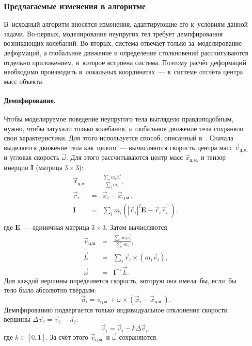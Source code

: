 \documentclass[a4paper, 14pt, titlepage]{extarticle}
\newcommand{\vect}[1]{\vec{#1}} %
\newcommand{\matx}[1]{\mathbf{#1}} %
\newcommand{\transposed}{\top} %
\begin{document}
      \subsubsection{Предлагаемые изменения в алгоритме}\label{sssec:proposed_changes}

        В~исходный алгоритм вносятся изменения, адаптирующие его к~условиям данной
        задачи. Во-первых, моделирование неупругих тел требует демпфирования возникающих колебаний.
        Во-вторых, система отвечает только за~моделирование деформаций, а глобальное движение и
        определение столкновений рассчитываются отдельно приложением, в~которое встроена система.
        Поэтому расчёт деформаций необходимо производить в~локальных координатах~--- в~системе отсчёта
        центра масс объекта.

        \paragraph{Демпфирование.} Чтобы моделируемое поведение неупругого тела выглядело правдоподобным,
        нужно, чтобы затухали только колебания, а глобальное движение тела сохраняло свои характеристики.
        Для этого используется способ, описанный в~\cite[с.~5]{mueller-position-dynamics}. Сначала выделяется
        движение тела как~целого~--- вычисляются скорость центра масс $\vect{v}_{ц.м.}$ и угловая
        скорость $\vect{\omega}$. Для этого рассчитываются центр масс
        $\vect{x}_{ц.м.}$ и тензор инерции $\matx I$ (матрица $3 \times 3$):
        \begin{eqnarray*}
          \vect{x}_{ц.м.} & = & \frac{\sum_i m_i \vect{x_i}}{\sum_i m_i},\\
          \vect{r}_i      & = & \vect{x}_i - \vect{x}_{ц.м.},\\
          \matx{I}        & = & \sum_i m_i ( |\vect{r}_i|^2 \matx E - \vect{r}_i \vect{r}_i^\transposed),\\
        \end{eqnarray*}
        где $\matx E$~--- единичная матрица $3 \times 3$. Затем вычисляются
        \begin{eqnarray*}
          \vect{v}_{ц.м.} & = & \frac{\sum_i m_i \vect{v_i}}{\sum_i m_i},\\
          \vect{L}        & = & \sum_i \vect{r}_i \times (m_i \vect{v}_i),\\
          \vect{\omega}   & = & \matx{I}^{-1} \vect{L}.
        \end{eqnarray*}
        Для каждой вершины определяется скорость,
        которую она имела~бы, если~бы тело было абсолютно твёрдым:
        \begin{equation}\label{eq:rigid_velocity}
          \vect{u}_i = v_{ц.м.} + \omega \times (\vect{x}_i - \vect{x}_{ц.м.}).
        \end{equation}
        Демпфированию подвергается только индивидуальное отклонение скорости вершины
        $\Delta \vect{v}_i = \vect{v}_i - \vect{u}_i$:
        \begin{equation}\label{eq:damping}
          \vect{v}_i = \vect{v}_i - k \Delta \vect{v}_i,
        \end{equation}
        где $k \in [0, 1]$. За счёт этого $\vect{v}_{ц.м.}$ и $\vect{\omega}$ сохраняются.
\end{document}
